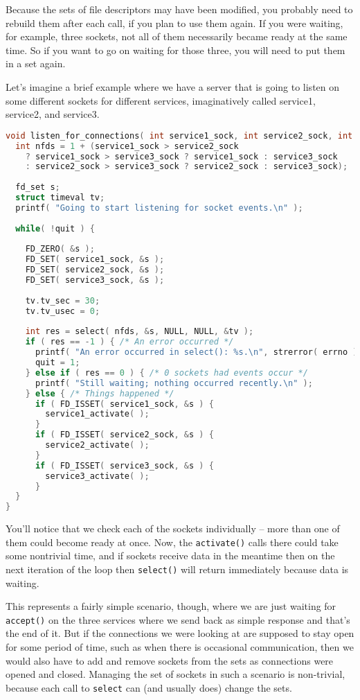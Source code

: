 Because the sets of file descriptors may have been modified, you probably need to rebuild them after each call, if you plan to use them again. If you were waiting, for example, three sockets, not all of them necessarily became ready at the same time. So if you want to go on waiting for those three, you will need to put them in a set again. 

Let's imagine a brief example where we have a server that is going to listen on some different sockets for different services, imaginatively called service1, service2, and service3.

\begin{lstlisting}[language=C]
void listen_for_connections( int service1_sock, int service2_sock, int service3_sock ) {
  int nfds = 1 + (service1_sock > service2_sock
    ? service1_sock > service3_sock ? service1_sock : service3_sock
    : service2_sock > service3_sock ? service2_sock : service3_sock);
    
  fd_set s;
  struct timeval tv;
  printf( "Going to start listening for socket events.\n" );
  
  while( !quit ) {
  
    FD_ZERO( &s );
    FD_SET( service1_sock, &s );
    FD_SET( service2_sock, &s );
    FD_SET( service3_sock, &s );
    
    tv.tv_sec = 30;
    tv.tv_usec = 0;
  
    int res = select( nfds, &s, NULL, NULL, &tv );
    if ( res == -1 ) { /* An error occurred */
      printf( "An error occurred in select(): %s.\n", strerror( errno ) );
      quit = 1;
    } else if ( res == 0 ) { /* 0 sockets had events occur */
      printf( "Still waiting; nothing occurred recently.\n" );
    } else { /* Things happened */
      if ( FD_ISSET( service1_sock, &s ) {
        service1_activate( ); 
      }
      if ( FD_ISSET( service2_sock, &s ) {
        service2_activate( ); 
      }
      if ( FD_ISSET( service3_sock, &s ) {
        service3_activate( ); 
      }
  }
}
\end{lstlisting}

You'll notice that we check each of the sockets individually -- more than one of them could become ready at once. Now, the \texttt{activate()} calls there could take some nontrivial time, and if sockets receive data in the meantime then on the next iteration of the loop then \texttt{select()} will return immediately because data is waiting.

This represents a fairly simple scenario, though, where we are just waiting for \texttt{accept()} on the three services where we send back as simple response and that's the end of it. But if the connections we were looking at are supposed to stay open for some period of time, such as when there is occasional communication, then we would also have to add and remove sockets from the sets as connections were opened and closed. Managing the set of sockets in such a scenario is non-trivial, because each call to \texttt{select} can (and usually does) change the sets. 

